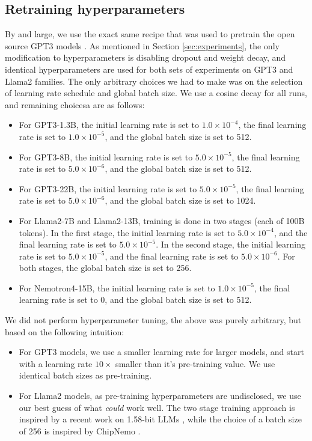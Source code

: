 \documentclass{article}
\theoremstyle{plain}
\begin{document}
\subsection{Retraining hyperparameters}
By and large, we use the exact same recipe that was used to pretrain the open source GPT3 models \cite{shoeybi2020megatronlm}. As mentioned in Section \ref{sec:experiments}, the only modification to hyperparameters is disabling dropout and weight decay, and identical hyperparameters are used for both sets of experiments on GPT3 and Llama2 families. The only arbitrary choices we had to make was on the selection of learning rate schedule and global batch size. We use a cosine decay for all runs, and remaining choicesa are as follows:
\begin{itemize}[leftmargin=1\baselineskip,itemsep=0\baselineskip,topsep=0pt]
\item For GPT3-1.3B, the initial learning rate is set to $1.0\times 10^{-4}$, the final learning rate is set to $1.0\times 10^{-5}$, and the global batch size is set to 512.
\item For GPT3-8B, the initial learning rate is set to $5.0\times 10^{-5}$, the final learning rate is set to $5.0\times 10^{-6}$, and the global batch size is set to 512.
\item For GPT3-22B, the initial learning rate is set to $5.0\times 10^{-5}$, the final learning rate is set to $5.0\times 10^{-6}$, and the global batch size is set to 1024.
\item For Llama2-7B and Llama2-13B, training is done in two stages (each of 100B tokens). In the first stage, the initial learning rate is set to $5.0\times 10^{-4}$, and the final learning rate is set to $5.0\times 10^{-5}$. In the second stage, the initial learning rate is set to $5.0\times 10^{-5}$, and the final learning rate is set to $5.0\times 10^{-6}$. For both stages, the global batch size is set to 256.
\item For Nemotron4-15B, the initial learning rate is set to $1.0\times 10^{-5}$, the final learning rate is set to 0, and the global batch size is set to 512.
\end{itemize}
We did not perform hyperparameter tuning, the above was purely arbitrary, but based on the following intuition:
\begin{itemize}[leftmargin=1\baselineskip,itemsep=0\baselineskip,topsep=0pt]
\item For GPT3 models, we use a smaller learning rate for larger models, and start with a learning rate $10\times$ smaller than it's pre-training value. We use identical batch sizes as pre-training.
\item For Llama2 models, as pre-training hyperparameters are undisclosed, we use our best guess of what \textit{could} work well. The two stage training approach is inspired by a recent work on 1.58-bit LLMs \cite{ma2024one_bit_llm}, while the choice of a batch size of 256 is inspired by ChipNemo \cite{liu2023chipnemo}.
\end{itemize}
\end{document}
